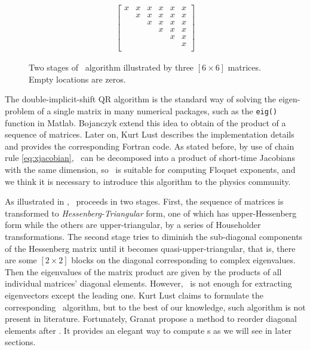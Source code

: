 \documentclass[final,leqno,onefignum,onetabnum]{siamltexmm}
\begin{document}
\begin{figure}
\begin{align*}
\begin{bmatrix}
      x & x & x & x & x & x \\
      & x & x & x & x & x \\
      &   & x & x & x & x \\
      &   &   & x & x & x \\
      &   &   &   & x & x \\
      &   &   &   &   & x \\
    \end{bmatrix}
  \end{align*}
  \caption{Two stages of \psd\ algorithm illustrated by
    {three $[6\!\times\! 6]$ matrices. Empty locations are zeros.}}
  \label{fig:PSD}
\end{figure}
The {double}-implicit-shift QR algorithm
is the standard way
of solving the eigen-problem of a single matrix in many numerical packages,
such as the
\texttt{eig()} function in Matlab.
Bojanczyk {\etal}
extend this
idea to {obtain \psd} of the product of a sequence of matrices. Later on,
Kurt Lust describes the implementation details and provides
the corresponding
Fortran code.
As stated before, by use of chain rule \eqref{eq:xjacobian},
\JacobianM\ can be decomposed into a product of short-time
Jacobians with the same dimension, so \psd\ is suitable for computing
Floquet exponents, and we think it is necessary to introduce this algorithm
to the physics community.

As illustrated in , \psd\ proceeds in two stages.
First, the sequence
of matrices is transformed to \emph{Hessenberg-Triangular} form,
one of which has upper-Hessenberg form while the others
are upper-triangular,
by a series of Householder {transformations}.
{The second stage tries to diminish} the sub-diagonal components of
the Hessenberg matrix until it becomes quasi-upper-triangular,
{that is, there are some}
$[2\!\times\! 2]$ blocks on the diagonal corresponding to
complex eigenvalues. Then the eigenvalues {of the matrix product are
given by the products of all individual matrices' diagonal elements}.
However, \psd\ is not enough for extracting eigenvectors except the leading one.
{Kurt Lust} claims to formulate the corresponding
 \Fv\ algorithm, but to
the best of our knowledge, such algorithm is not present in literature.
Fortunately, Granat {\etal} propose a method to reorder diagonal elements
after \psd. It provides an elegant way to compute \Fv s as we will see in
later sections.
\end{document}
